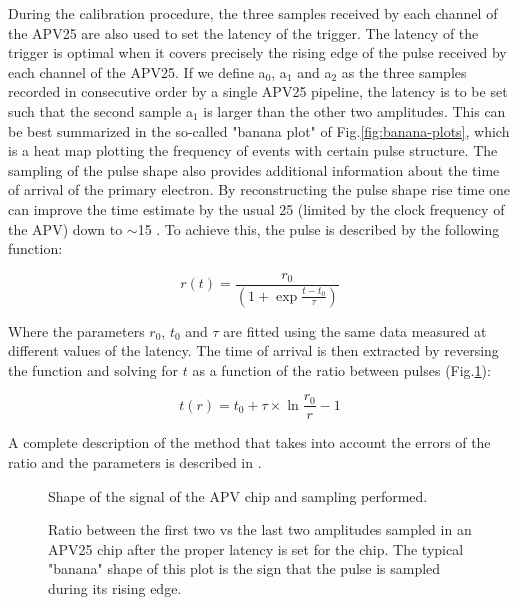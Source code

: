 During the calibration procedure, the three samples received by each channel of the APV25 are also used to set the latency of the trigger. The latency of the trigger is optimal when it covers precisely the rising edge of the pulse received by each channel of the APV25. If we define a$_0$, a$_1$ and a$_2$ as the three samples recorded in consecutive order by a single APV25 pipeline, the latency is to be set such that the second sample a$_1$ is larger than the other two amplitudes. This can be best summarized in the so-called "banana plot" of Fig.\ref{fig:banana-plots}, which is a heat map plotting the frequency of events with certain pulse structure. The sampling of the pulse shape also provides additional information about the time of arrival of the primary electron. By reconstructing the pulse shape rise time one can improve the time estimate by the usual 25 \nas (limited by the clock frequency of the APV) down to $\sim$15 \nas \cite{Banerjee:2017mdu}. To achieve this, the pulse is described by the following function:

\begin{equation}
\label{eq:apv-pulse}
r(t) = \frac{r_0}{(1 + \exp{\frac{t-t_0}{\tau}})}
\end{equation}

Where the parameters $r_0$, $t_0$ and $\tau$ are fitted using the same data measured at different values of the latency. The time of arrival is then extracted by reversing the function and solving for $t$ as a function of the ratio between pulses (Fig.\ref{fig:apv-signal-shape}):

\begin{equation}
\label{eq:2}
t(r) = t_0 + \tau \times \ln{\frac{r_0}{r} - 1}
\end{equation}

A complete description of the method that takes into account the errors of the ratio and the parameters is described in \cite{dbanerjee-thesis}.


\begin{figure}[bth!]
\centering
\caption[apv signal shape]{Shape of the signal of the APV chip and sampling performed.}
\label{fig:apv-signal-shape}
\end{figure}

\begin{figure}[!bth]
\centering
\caption[APV25 banana plot]{Ratio between the first two vs the last two amplitudes sampled in an APV25 chip after the proper latency is set for the chip. The typical "banana" shape of this plot is the sign that the pulse is sampled during its rising edge.}
\label{fig:banana-plot}
\end{figure}

